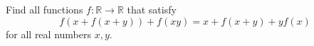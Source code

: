 \documentclass[11pt]{scrartcl}
\begin{document}
\begin{itemize}[label=,itemsep=0.4em,leftmargin=0em]
\begin{comment}
            Thus, all functions that satisfy the condition are:
            \[
            \boxed{f(x) = 0, \forall x \in \mathbb{R}},
            \boxed{f(x) = x - 1, \forall x \in \mathbb{R}},
            \boxed{f(x) = 1 - x, \forall x \in \mathbb{R}}
            \]
      \end{comment}



    \begin{btvn}
        Find all functions $f: \mathbb{R} \to \mathbb{R}$ that satisfy
        \[
           f(x + f(x + y)) + f(xy) = x + f(x + y) + yf(x)\tag{1}
        \]
        for all real numbers $x,y$.
    \end{btvn}
    \begin{comment}
       Let $P(x,y)$ denote substitution into equation $(1)$. Define $\bb{S} = \{t \mid f(t) = t\}$ as the set of fixed points.

        $P(x,1) \ra f(x + f(x + 1)) = x + f(x + 1), \xr \ra x + f(x + 1) \in \bb{S}$

        $P(0,0) \ra f(f(0)) = 0$.

        $P(0,f(0)) \ra 2f(0) = f(0)^2$

        \textbf{Case 1:} $f(0) = 2$.

        Let $t$ be an arbitrary fixed point in $\bb{S}$.

        $P(t,0) \ra t + 2 = 2t \ra t = 2$. Also, since $x + f(x + 1) \in \bb{S}$, we have $x + f(x + 1) = t = 2 \ra f(x) = 2 - x, \xr$

        \textbf{Case 2:} $f(0) = 0$.

        $P(0,x) \ra f(f(x)) = f(x) \ra f(x) \in \bb{S}$

        $P(-x,x) \ra f(-x) + f(-x^2) = -x + x f(-x)$ (2).

        Setting $x = 1$ gives $2f(-1) = -1 + f(-1) \ra f(-1) = -1$

        $P(x,-x) \ra f(x) + f(-x^2) = x - x f(x)$ (3).

        Setting $x = 1$ gives $f(1) = 1$.

        $P(x - 1, 1) \ra f(x - 1 + f(x)) = x - 1 + f(x) \ra x - 1 + f(x) \in \bb{S}$

        $P(1, f(x) + x - 1) \ra f(x + 1 + f(x)) = x + 1 + f(x) \ra x + 1 + f(x) \in \bb{S}$.

        $P(x,-1) \ra f(x + f(x - 1)) + f(-x) = x + f(x - 1) - f(x) \ra f(-x) = -f(x), \xr$

        From (2) and (3), we deduce $f(-x) - f(x) = -2x + x(f(-x) + f(x)) \ra -2f(x) = 2x \ra f(x) = x, \xr$


\end{comment}
\end{itemize}
\end{document}
